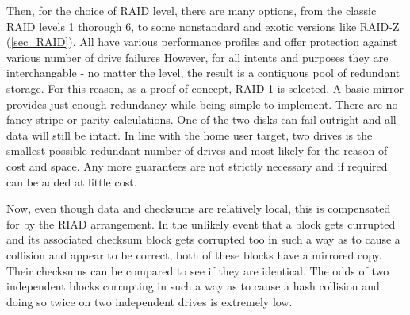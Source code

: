 
        Then, for the choice of RAID level, there are many options, from the
        classic RAID levels 1 thorough 6, to some nonstandard and exotic
        versions like RAID-Z (\ref{sec_RAID}). All have various performance
        profiles and offer protection against various number of drive failures
        However, for all intents and purposes they are interchangable - no
        matter the level, the result is a contiguous pool of redundant storage.
        For this reason, as a proof of concept, RAID 1 is selected. A basic
        mirror provides just enough redundancy while being simple to implement.
        There are no fancy stripe or parity calculations. One of the two disks
        can fail outright and all data will still be intact.  In line with the
        home user target, two drives is the smallest possible redundant number
        of drives and most likely for the reason of cost and space. Any more
        guarantees are not strictly necessary and if required can be added at
        little cost.

        Now, even though data and checksums are relatively local, this is
        compensated for by the RIAD arrangement. In the unlikely event that a
        block gets currupted and its associated checksum block gets corrupted
        too in such a way as to cause a collision and appear to be correct,
        both of these blocks have a mirrored copy. Their checksums can be
        compared to see if they are identical. The odds of two independent
        blocks corrupting in such a way as to cause a hash collision and doing
        so twice on two independent drives is extremely low.
